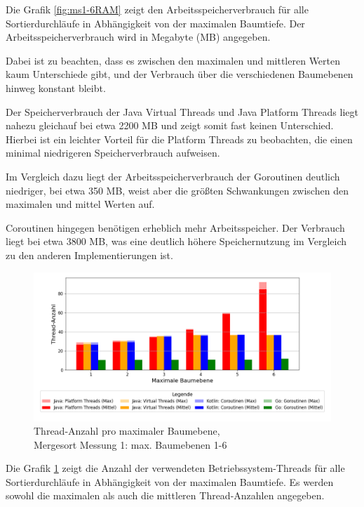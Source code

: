 \documentclass[fontsize=12pt,paper=a4,twoside=semi,parskip=half-,headsepline,headinclude]{scrreprt}
\begin{document}
Die Grafik \ref{fig:ms1-6RAM} zeigt den Arbeitsspeicherverbrauch für alle Sortierdurchläufe in Ab\-hän\-gig\-keit von der maximalen Baumtiefe. Der Arbeitsspeicherverbrauch wird in Megabyte (MB) angegeben.

Dabei ist zu beachten, dass es zwischen den maximalen und mittleren Werten kaum Unterschiede gibt, und der Verbrauch über die verschiedenen Baumebenen hinweg konstant bleibt.

Der Speicherverbrauch der Java Virtual Threads und Java Platform Threads liegt nahezu gleichauf bei etwa 2200 MB und zeigt somit fast keinen Unterschied. Hierbei ist ein leichter Vorteil für die Platform Threads zu beobachten, die einen minimal niedrigeren Speicherverbrauch aufweisen.

Im Vergleich dazu liegt der Arbeitsspeicherverbrauch der Goroutinen deutlich niedriger, bei etwa 350 MB, weist aber die größten Schwankungen zwischen den maximalen und mittel Werten auf.

Coroutinen hingegen benötigen erheblich mehr Arbeitsspeicher. Der Verbrauch liegt bei etwa  3800 MB, was eine deutlich höhere Speichernutzung im Vergleich zu den anderen Implementierungen ist.

\begin{figure}[H]
	\centering
	\includegraphics[scale=0.5]{figures/mergesort/Maximalebauebenen1-6/num_threads_bar_plot.png}
	\caption{Thread-Anzahl pro maximaler Baumebene,\\ Mergesort Messung 1: max. Baumebenen 1-6}
	\label{fig:ms1-6Threads}
\end{figure}

Die Grafik \ref{fig:ms1-6Threads} zeigt die Anzahl der verwendeten Betriebssystem-Threads für alle Sortierdurchläufe in Abhängigkeit von der maximalen Baumtiefe. Es werden sowohl die maximalen als auch die mittleren Thread-Anzahlen angegeben.
\end{document}
